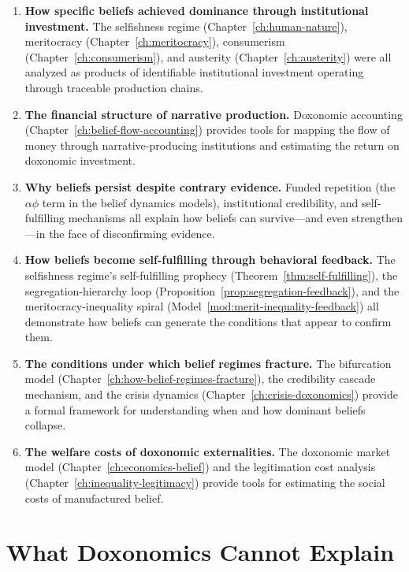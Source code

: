 \begin{enumerate}
  \item \textbf{How specific beliefs achieved dominance through institutional investment.}
  The selfishness regime (Chapter~\ref{ch:human-nature}), meritocracy (Chapter~\ref{ch:meritocracy}), consumerism (Chapter~\ref{ch:consumerism}), and austerity (Chapter~\ref{ch:austerity}) were all analyzed as products of identifiable institutional investment operating through traceable production chains.

  \item \textbf{The financial structure of narrative production.}
  Doxonomic accounting (Chapter~\ref{ch:belief-flow-accounting}) provides tools for mapping the flow of money through narrative-producing institutions and estimating the return on doxonomic investment.

  \item \textbf{Why beliefs persist despite contrary evidence.}
  Funded repetition (the $\alpha\phi$ term in the belief dynamics models), institutional credibility, and self-fulfilling mechanisms all explain how beliefs can survive---and even strengthen---in the face of disconfirming evidence.

  \item \textbf{How beliefs become self-fulfilling through behavioral feedback.}
  The selfishness regime's self-fulfilling prophecy (Theorem~\ref{thm:self-fulfilling}), the segregation-hierarchy loop (Proposition~\ref{prop:segregation-feedback}), and the meritocracy-inequality spiral (Model~\ref{mod:merit-inequality-feedback}) all demonstrate how beliefs can generate the conditions that appear to confirm them.

  \item \textbf{The conditions under which belief regimes fracture.}
  The bifurcation model (Chapter~\ref{ch:how-belief-regimes-fracture}), the credibility cascade mechanism, and the crisis dynamics (Chapter~\ref{ch:crisis-doxonomics}) provide a formal framework for understanding when and how dominant beliefs collapse.

  \item \textbf{The welfare costs of doxonomic externalities.}
  The doxonomic market model (Chapter~\ref{ch:economics-belief}) and the legitimation cost analysis (Chapter~\ref{ch:inequality-legitimacy}) provide tools for estimating the social costs of manufactured belief.
\end{enumerate}

\section{What Doxonomics Cannot Explain}
\label{sec:ch35-cannot}

